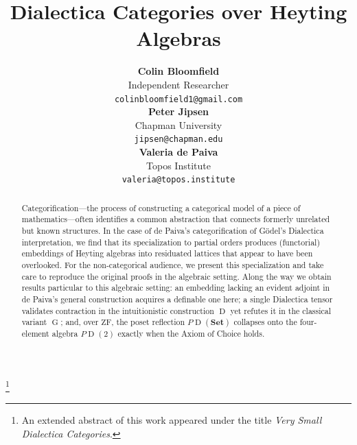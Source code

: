 \documentclass[reqno]{amsart}
\theoremstyle{plain}
\theoremstyle{definition}
\newcommand{\Set}{\mathbf{Set}}
\DeclareMathOperator{\D}{D}
\DeclareMathOperator{\G}{G}
\begin{document}
\title{Dialectica Categories over Heyting Algebras}
\thanks{An extended abstract of this work appeared under the title \emph{Very Small Dialectica Categories}.}




\providecommand{\NoCaseChange}[1]{#1}
\author[C. Bloomfield, P. Jipsen, and V. de Paiva]{\NoCaseChange{%
\normalfont\upshape
\begin{minipage}[t]{0.33\textwidth}\centering
\textbf{Colin Bloomfield} \\
{\small Independent Researcher} \\
{\small\texttt{colinbloomfield1@gmail.com}}
\end{minipage}%
\begin{minipage}[t]{0.33\textwidth}\centering
\textbf{Peter Jipsen} \\
{\small Chapman University} \\
{\small\texttt{jipsen@chapman.edu}}
\end{minipage}%
\begin{minipage}[t]{0.33\textwidth}\centering
\textbf{Valeria de Paiva} \\
{\small Topos Institute} \\
{\small\texttt{valeria@topos.institute}}
\end{minipage}%
}}

\begin{abstract}
Categorification---the process of constructing a categorical model of a piece of mathematics---often identifies a common abstraction that connects formerly unrelated but known structures. In the case of de Paiva's categorification of G\"odel's Dialectica interpretation, %
we find that its specialization to partial orders produces  (functorial) embeddings of Heyting algebras into residuated lattices that
appear to have been overlooked. For the non-categorical audience, we present this specialization and take care to reproduce the original proofs in the algebraic setting. Along the way we obtain results particular to this algebraic setting: an embedding lacking an evident adjoint in de Paiva's general construction acquires a definable one here; a single Dialectica tensor validates contraction in the intuitionistic construction $\D$ yet refutes it in the classical variant $\G$; and, over $\mathrm{ZF}$, the poset reflection $P\D(\Set)$ collapses onto the four-element algebra $P\D(2)$ exactly when the Axiom of Choice holds.
\end{abstract}
\end{document}
